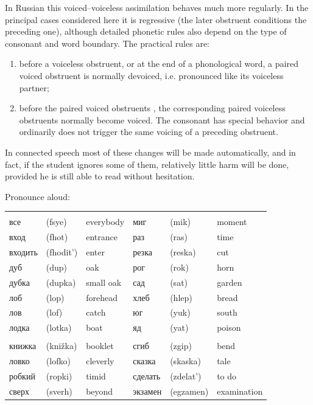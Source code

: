 In Russian this voiced--voiceless assimilation behaves much more regularly. In the principal cases considered here it is regressive (the later obstruent conditions the preceding one), although detailed phonetic rules also depend on the type of consonant and word boundary. The practical rules are:

\begin{enumerate}[label=\alph*)]
\item before a voiceless obstruent, or at the end of a phonological word, a paired voiced obstruent is normally devoiced, i.e. pronounced like its voiceless partner;
\item before the paired voiced obstruents , the corresponding paired voiceless obstruents  normally become voiced. The consonant  has special behavior and ordinarily does not trigger the same voicing of a preceding obstruent.
\end{enumerate}

In connected speech most of these changes will be made automatically, and in fact, if the student ignores some of them, relatively little harm will be done, provided he is still able to read without hesitation.

\begin{keybox}[Exercise 2.4]
Pronounce aloud:
\end{keybox}

\begingroup
\small
\setlength{\tabcolsep}{1.5pt}
\begin{longtable}{@{}>{\cyrillicfont}p{22mm} p{17mm} p{28mm} >{\cyrillicfont}p{22mm} p{17mm} p{28mm}@{}}
\multicolumn{6}{@{}l}{\textit{a) Devoicing}}\\[2pt]
все & (fsye) & everybody & миг & (mik) & moment\\
вход & (fhot) & entrance & раз & (ras) & time\\
входить & (fhodit') & enter & резка & (reska) & cut\\
дуб & (dup) & oak & рог & (rok) & horn\\
дубка & (dupka) & small oak & сад & (sat) & garden\\
лоб & (lop) & forehead & хлеб & (hlep) & bread\\
лов & (lof) & catch & юг & (yuk) & south\\
лодка & (lotka) & boat & яд & (yat) & poison\\[4pt]
\multicolumn{6}{@{}l}{\textit{b) Voicing and cluster assimilation}}\\[2pt]
книжка & (knižka) & booklet & сгиб & (zgip) & bend\\
ловко & (lofko) & cleverly & сказка & (skaska) & tale\\
робкий & (ropki) & timid & сделать & (zdelat') & to do\\
сверх & (sverh) & beyond & экзамен & (egzamen) & examination\\
\end{longtable}
\endgroup

